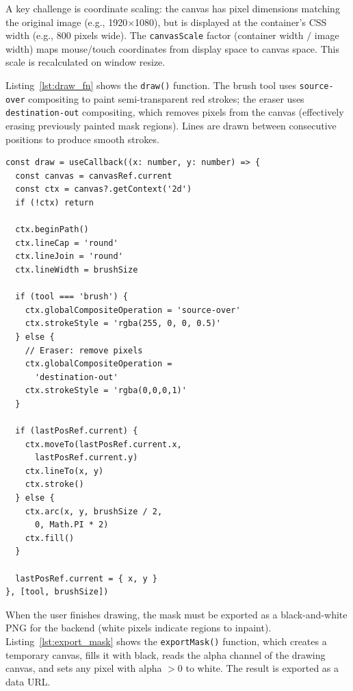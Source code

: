 \documentclass[12pt,a4paper]{report}
\begin{document}
A key challenge is coordinate scaling: the canvas has pixel dimensions matching the original image (e.g., 1920$\times$1080), but is displayed at the container's CSS width (e.g., 800 pixels wide). The \texttt{canvasScale} factor (container width $/$ image width) maps mouse/touch coordinates from display space to canvas space. This scale is recalculated on window resize.

Listing~\ref{lst:draw_fn} shows the \texttt{draw()} function. The brush tool uses \texttt{source-over} compositing to paint semi-transparent red strokes; the eraser uses \texttt{destination-out} compositing, which removes pixels from the canvas (effectively erasing previously painted mask regions). Lines are drawn between consecutive positions to produce smooth strokes.

\begin{lstlisting}[language={[LaTeX]TeX}, caption={Canvas drawing function (\texttt{MaskCanvas.tsx})}, label={lst:draw_fn}, morekeywords={const,if,else,return,function,useCallback}]
const draw = useCallback((x: number, y: number) => {
  const canvas = canvasRef.current
  const ctx = canvas?.getContext('2d')
  if (!ctx) return

  ctx.beginPath()
  ctx.lineCap = 'round'
  ctx.lineJoin = 'round'
  ctx.lineWidth = brushSize

  if (tool === 'brush') {
    ctx.globalCompositeOperation = 'source-over'
    ctx.strokeStyle = 'rgba(255, 0, 0, 0.5)'
  } else {
    // Eraser: remove pixels
    ctx.globalCompositeOperation =
      'destination-out'
    ctx.strokeStyle = 'rgba(0,0,0,1)'
  }

  if (lastPosRef.current) {
    ctx.moveTo(lastPosRef.current.x,
      lastPosRef.current.y)
    ctx.lineTo(x, y)
    ctx.stroke()
  } else {
    ctx.arc(x, y, brushSize / 2,
      0, Math.PI * 2)
    ctx.fill()
  }

  lastPosRef.current = { x, y }
}, [tool, brushSize])
\end{lstlisting}

When the user finishes drawing, the mask must be exported as a black-and-white PNG for the backend (white pixels indicate regions to inpaint). Listing~\ref{lst:export_mask} shows the \texttt{exportMask()} function, which creates a temporary canvas, fills it with black, reads the alpha channel of the drawing canvas, and sets any pixel with alpha $> 0$ to white. The result is exported as a data URL.
\end{document}
